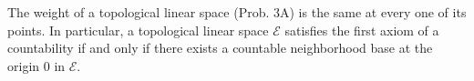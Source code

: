 The weight of a topological linear space (Prob. 3A) is the same at every one of its points. In particular, a topological linear space $\mathcal{E}$ satisfies the first axiom of a countability if and only if there exists a countable neighborhood base at the origin 0 in $\mathcal{E}$.
